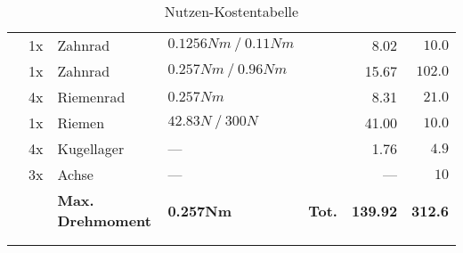 \begin{longtable}{p{0.5cm}p{0.8cm}lp{3cm}p{0.5cm}rr}
      & 1x    & Zahnrad         & $0.1256 Nm~/~0.11 Nm$& & 8.02   & $10.0$ \\
      & 1x    & Zahnrad         & $0.257 Nm~/~0.96 Nm$ & & 15.67  & $102.0$ \\
      & 4x    & Riemenrad       & $0.257 Nm$           & & 8.31   & $21.0$ \\
      & 1x    & Riemen          & $42.83 N~/~300 N$    & & 41.00  & $10.0$ \\
      & 4x    & Kugellager      & {---}                & & 1.76   & $4.9$ \\
      & 3x    & Achse           & {---}                & & {---}  & $10$ \\
      & & \textbf{Max. Drehmoment} & \textbf{0.257Nm} & \textbf{Tot.} & \textbf{139.92} & \textbf{312.6} \\
      &       &                 &                     &  &          &  \\
  \caption{Nutzen-Kostentabelle}       
  \label{tab:addlabel}
\end{longtable}